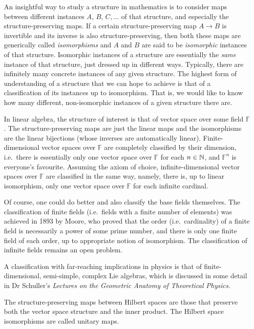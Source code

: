 \br An insightful way to study a structure in mathematics is to consider maps between different instances $A$, $B$, $C,\ldots$ of that structure, and especially the structure-preserving maps. If a certain structure-preserving map $A\to B$ is invertible and its inverse is also structure-preserving, then both these maps are generically called \emph{isomorphisms} and $A$ and $B$ are said to be \emph{isomorphic} instances of that structure. Isomorphic instances of a structure are essentially the \emph{same} instance of that structure, just dressed up in different ways.
Typically, there are infinitely many concrete instances of any given structure. The highest form of understanding of a structure that we can hope to achieve is that of a classification of its instances up to isomorphism. That is, we would like to know how many different, non-isomorphic instances of a given structure there are.

In linear algebra, the structure of interest is that of vector space over some field $\mathbb{F}$. The structure-preserving maps are just the linear maps and the isomorphisms are the linear bijections (whose inverses are automatically linear). Finite-dimensional vector spaces over $\mathbb{F}$ are completely classified by their dimension, i.e.\ there is essentially only one vector space over $\mathbb{F}$ for each $n\in \mathbb{N}$, and $\mathbb{F}^n$ is everyone's favourite.  Assuming the axiom of choice,
infinite-dimensional vector spaces over $\mathbb{F}$ are classified in the  same way, namely, there is, up to linear isomorphism, only one vector space over $\mathbb{F}$ for each infinite cardinal.

Of course, one could do better and also classify the base fields themselves. The classification of finite fields (i.e.\ fields with a finite number of elements) was achieved in 1893 by Moore, who proved that the order (i.e.\ cardinality) of a finite field is necessarily a power of some prime number, and there is only one finite field of each order, up to appropriate notion of isomorphism. The classification of infinite fields remains an open problem.

A classification with far-reaching implications in physics is that of finite-dimensional, semi-simple, complex Lie algebras, which is discussed in some detail in Dr Schuller's \textit{Lectures on the Geometric Anatomy of Theoretical Physics.}
\er

The structure-preserving maps between Hilbert spaces are those that preserve both the vector space structure and the inner product. The Hilbert space isomorphisms are called unitary maps.


